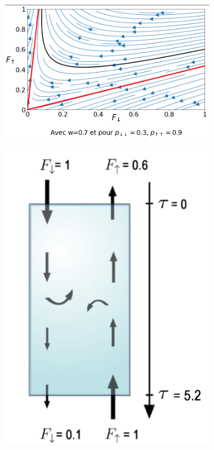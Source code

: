 \documentclass[12pt]{article}
\begin{document}
\begin{figure}[H]
    \centering
    \begin{subfigure}{0.61\textwidth}
      \centering
      \includegraphics[width=1\textwidth]{Graphe/non.iso.png}
      \captionsetup{width=.85\textwidth}
      \caption{} 
      \label{graph:non.iso}
    \end{subfigure}
    \begin{subfigure}{0.335\textwidth}
        \centering  \includegraphics[width=1\textwidth]{Schema/non.iso.png}

\end{subfigure}
\end{figure}
\end{document}
